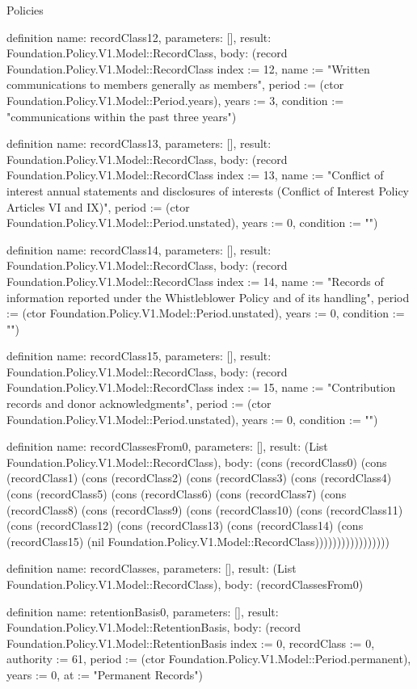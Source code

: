 \begin{lexlean}{Policies}
\begin{semanticmodule}
definition{
  name: recordClass12,
  parameters: [],
  result: Foundation.Policy.V1.Model::RecordClass,
  body: (record Foundation.Policy.V1.Model::RecordClass {index := 12, name := "Written communications to members generally as members", period := (ctor Foundation.Policy.V1.Model::Period.years), years := 3, condition := "communications within the past three years"})
}

definition{
  name: recordClass13,
  parameters: [],
  result: Foundation.Policy.V1.Model::RecordClass,
  body: (record Foundation.Policy.V1.Model::RecordClass {index := 13, name := "Conflict of interest annual statements and disclosures of interests (Conflict of Interest Policy Articles VI and IX)", period := (ctor Foundation.Policy.V1.Model::Period.unstated), years := 0, condition := ""})
}

definition{
  name: recordClass14,
  parameters: [],
  result: Foundation.Policy.V1.Model::RecordClass,
  body: (record Foundation.Policy.V1.Model::RecordClass {index := 14, name := "Records of information reported under the Whistleblower Policy and of its handling", period := (ctor Foundation.Policy.V1.Model::Period.unstated), years := 0, condition := ""})
}

definition{
  name: recordClass15,
  parameters: [],
  result: Foundation.Policy.V1.Model::RecordClass,
  body: (record Foundation.Policy.V1.Model::RecordClass {index := 15, name := "Contribution records and donor acknowledgments", period := (ctor Foundation.Policy.V1.Model::Period.unstated), years := 0, condition := ""})
}

definition{
  name: recordClassesFrom0,
  parameters: [],
  result: (List Foundation.Policy.V1.Model::RecordClass),
  body: (cons (recordClass0) (cons (recordClass1) (cons (recordClass2) (cons (recordClass3) (cons (recordClass4) (cons (recordClass5) (cons (recordClass6) (cons (recordClass7) (cons (recordClass8) (cons (recordClass9) (cons (recordClass10) (cons (recordClass11) (cons (recordClass12) (cons (recordClass13) (cons (recordClass14) (cons (recordClass15) (nil Foundation.Policy.V1.Model::RecordClass)))))))))))))))))
}

definition{
  name: recordClasses,
  parameters: [],
  result: (List Foundation.Policy.V1.Model::RecordClass),
  body: (recordClassesFrom0)
}

definition{
  name: retentionBasis0,
  parameters: [],
  result: Foundation.Policy.V1.Model::RetentionBasis,
  body: (record Foundation.Policy.V1.Model::RetentionBasis {index := 0, recordClass := 0, authority := 61, period := (ctor Foundation.Policy.V1.Model::Period.permanent), years := 0, at := "Permanent Records"})
}


\end{semanticmodule}
\end{lexlean}
